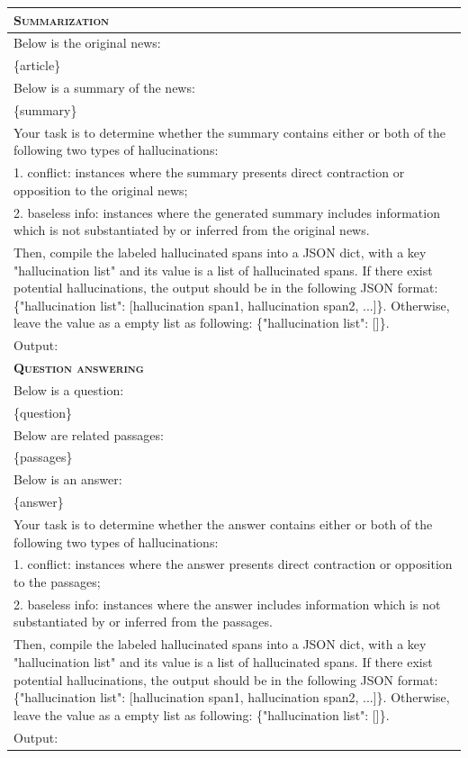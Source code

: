 \begin{table}[!ht]

\renewcommand{\arraystretch}{1.1}

\small
\centering
    \begin{tabular}{p{}}
    \toprule
    \textbf{\textsc{Summarization}}\\
    \midrule
    Below is the original news:\\
\{article\}\\
Below is a summary of the news:\\
\{summary\}\\
Your task is to determine whether the summary contains either or both of the following two types of hallucinations:\\
1. conflict: instances where the summary presents direct contraction or opposition to the original news;\\
2. baseless info: instances where the generated summary includes information which is not substantiated by or inferred from the original news. \\
Then, compile the labeled hallucinated spans into a JSON dict, with a key "hallucination list" and its value is a list of hallucinated spans. If there exist potential hallucinations, the output should be in the following JSON format: \{"hallucination list": [hallucination span1, hallucination span2, ...]\}. Otherwise, leave the value as a empty list as following: \{"hallucination list": []\}.\\
Output:\\
    \midrule
    \textbf{\textsc{Question answering}}\\
    \midrule
        Below is a question:\\
\{question\}\\
Below are related passages:\\
\{passages\}\\
Below is an answer:\\
\{answer\}\\
Your task is to determine whether the answer contains either or both of the following two types of hallucinations: \\
1. conflict: instances where the answer presents direct contraction or opposition to the passages;\\
2. baseless info: instances where the answer includes information which is not substantiated by or inferred from the passages.\\
Then, compile the labeled hallucinated spans into a JSON dict, with a key "hallucination list" and its value is a list of hallucinated spans. If there exist potential hallucinations, the output should be in the following JSON format: \{"hallucination list": [hallucination span1, hallucination span2, ...]\}. Otherwise, leave the value as a empty list as following: \{"hallucination list": []\}.\\
Output:\\
    

\end{tabular}
\end{table}
